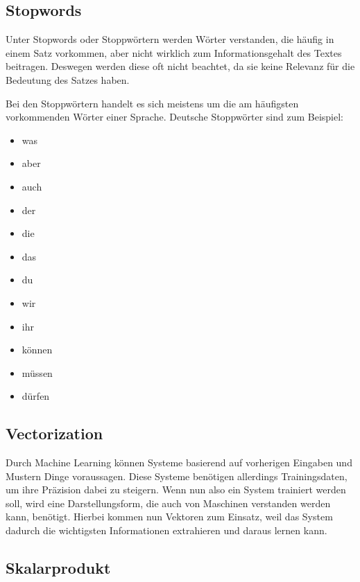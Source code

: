 \subsection{Stopwords}\label{subsec:stopwords}

Unter Stopwords oder Stoppwörtern werden Wörter verstanden, die häufig in einem Satz vorkommen, aber nicht wirklich zum Informationsgehalt des Textes beitragen.
Deswegen werden diese oft nicht beachtet, da sie keine Relevanz für die Bedeutung des Satzes haben.

Bei den Stoppwörtern handelt es sich meistens um die am häufigsten vorkommenden Wörter einer Sprache.
Deutsche Stoppwörter sind zum Beispiel:\cite{germanStopwords}

\begin{itemize}
    \item was
    \item aber
    \item auch
    \item der
    \item die
    \item das
    \item du
    \item wir
    \item ihr
    \item können
    \item müssen
    \item dürfen
\end{itemize}

\subsection{Vectorization}\label{subsec:vectorization}

Durch Machine Learning können Systeme basierend auf vorherigen Eingaben und Mustern Dinge voraussagen.
Diese Systeme benötigen allerdings Trainingsdaten, um ihre Präzision dabei zu steigern.
Wenn nun also ein System trainiert werden soll, wird eine Darstellungsform, die auch von Maschinen verstanden werden kann, benötigt.
Hierbei kommen nun Vektoren zum Einsatz, weil das System dadurch die wichtigsten Informationen extrahieren und daraus lernen kann.

\subsection{Skalarprodukt}\label{subsec:scale-product}

